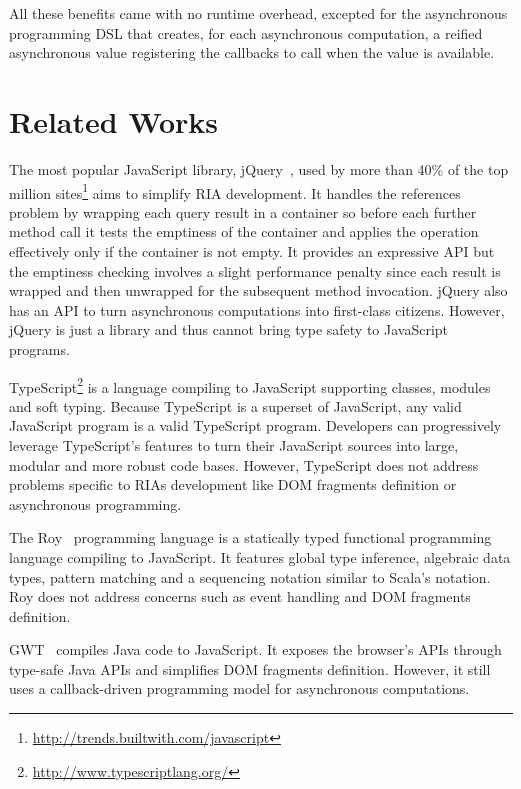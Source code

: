 \documentclass[american,english,runningheads]{llncs}
\begin{document}
All these benefits came with no runtime overhead, excepted for the asynchronous programming DSL that creates, for
each asynchronous computation, a reified asynchronous value registering the callbacks to call when the value is
available.

\section{Related Works}
\label{related}

The most popular JavaScript library, jQuery~\cite{Bibeault08_jQuery}, used by more than 40\% of the top million
sites\footnote{\href{http://trends.builtwith.com/javascript}{http://trends.builtwith.com/javascript}} aims to
simplify RIA development. It handles the  references problem by wrapping each query result in a container
so before each further method call it tests the emptiness of the container and applies the operation effectively only
if the container is not empty. It provides an expressive API but the emptiness checking involves a slight performance
penalty since each result is wrapped and then unwrapped for the subsequent method invocation. jQuery also has an API
to turn asynchronous computations into first-class citizens. However, jQuery is just a library and thus cannot bring
type safety to JavaScript programs.

TypeScript\footnote{\href{http://www.typescriptlang.org/}{http://www.typescriptlang.org/}} is a language compiling to
JavaScript supporting classes, modules and soft typing. Because TypeScript is a superset of JavaScript, any valid
JavaScript program is a valid TypeScript program. Developers can progressively leverage TypeScript’s features to turn
their JavaScript sources into large, modular and more robust code bases. However, TypeScript does not address
problems specific to RIAs development like DOM fragments definition or asynchronous programming.

The Roy~\cite{McKenna_Roy} programming language is a statically typed functional programming language compiling to
JavaScript. It features global type inference, algebraic data types, pattern matching and a sequencing notation
similar to Scala’s  notation. Roy does not address concerns such as event handling and DOM fragments
definition.

GWT~\cite{Chaganti07_GWT} compiles Java code to JavaScript. It exposes the browser’s APIs through type-safe Java APIs
and simplifies DOM fragments definition. However, it still uses a callback-driven programming model for asynchronous
computations.
\end{document}
